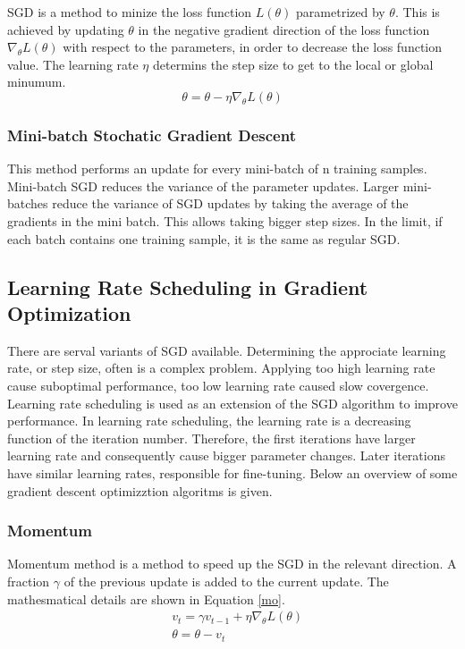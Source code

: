     SGD is a method to minize the loss function \(L(\theta)\)  parametrized by $\theta$. This is achieved by updating $\theta$ in the negative gradient direction of the loss function $\nabla_{\theta}L(\theta)$ with respect to the parameters, in order to decrease the loss function value. The learning rate $\eta$ determins the step size to get to the local or global minumum. 
    \begin{equation}
        \theta = \theta - \eta \nabla_{\theta}L(\theta)
    \end{equation}

    \subsubsection{Mini-batch Stochatic Gradient Descent}
    This method performs an update for every mini-batch of n training samples. Mini-batch SGD reduces the variance of the parameter updates. Larger mini-batches reduce the variance of SGD updates by taking the average of the gradients in the mini batch. This allows taking bigger step sizes. In the limit, if each batch contains one training sample, it is the same as regular SGD.

    \subsection{Learning Rate Scheduling in Gradient Optimization}
    There are serval variants of SGD available. Determining the approciate learning rate, or step size, often is a complex problem. Applying too high learning rate cause suboptimal performance, too low learning rate caused slow covergence. Learning rate scheduling is used as an extension of the SGD algorithm to improve performance. In learning rate scheduling, the learning rate is a decreasing function of the iteration number. Therefore, the first iterations have larger learning rate and consequently cause bigger parameter changes. Later iterations have similar learning rates, responsible for fine-tuning. Below an overview of some gradient descent optimizztion algoritms is given.

    \subsubsection{Momentum}
    Momentum method is a method to speed up the SGD in the relevant direction.  A fraction $\gamma$ of the previous update is added to the current update. The mathesmatical details are shown in Equation \ref{mo}.
    \begin{equation}
        \begin{aligned}
            & v_t = \gamma v_{t-1} + \eta \nabla_{\theta}L(\theta) \\
            & \theta = \theta - v_{t}
        \end{aligned}
        \label{mo}
    \end{equation} 
